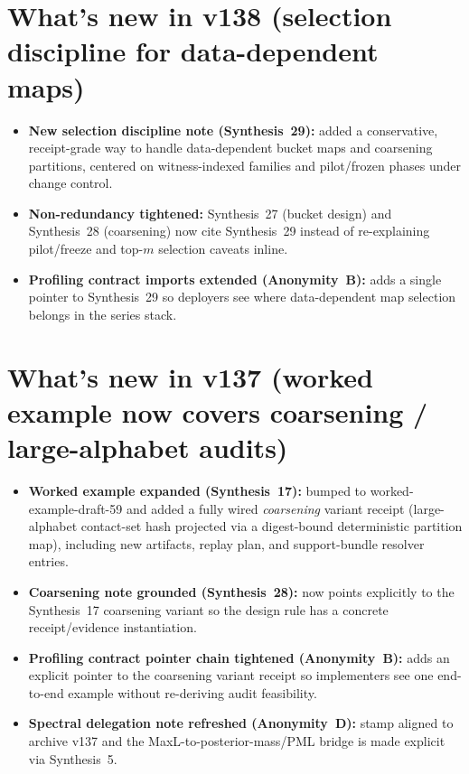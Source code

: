 \documentclass[11pt]{article}
\begin{document}
\section{What's new in v138 (selection discipline for data-dependent maps)}
\begin{itemize}[leftmargin=*]
\item \textbf{New selection discipline note (Synthesis~29):} added a conservative, receipt-grade way to handle data-dependent bucket maps and coarsening partitions, centered on witness-indexed families and pilot/frozen phases under change control.
\item \textbf{Non-redundancy tightened:} Synthesis~27 (bucket design) and Synthesis~28 (coarsening) now cite Synthesis~29 instead of re-explaining pilot/freeze and top-$m$ selection caveats inline.
\item \textbf{Profiling contract imports extended (Anonymity~B):} adds a single pointer to Synthesis~29 so deployers see where data-dependent map selection belongs in the series stack.
\end{itemize}

\section{What's new in v137 (worked example now covers coarsening / large-alphabet audits)}
\begin{itemize}[leftmargin=*]
\item \textbf{Worked example expanded (Synthesis~17):} bumped to worked-example-draft-59 and added a fully wired \emph{coarsening} variant receipt (large-alphabet contact-set hash projected via a digest-bound deterministic partition map), including new artifacts, replay plan, and support-bundle resolver entries.
\item \textbf{Coarsening note grounded (Synthesis~28):} now points explicitly to the Synthesis~17 coarsening variant so the design rule has a concrete receipt/evidence instantiation.
\item \textbf{Profiling contract pointer chain tightened (Anonymity~B):} adds an explicit pointer to the coarsening variant receipt so implementers see one end-to-end example without re-deriving audit feasibility.
\item \textbf{Spectral delegation note refreshed (Anonymity~D):} stamp aligned to archive v137 and the MaxL-to-posterior-mass/PML bridge is made explicit via Synthesis~5.
\end{itemize}
\end{document}
